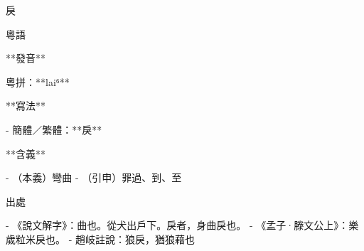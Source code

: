 戾

  



粵語

**發音**

粵拼：**lai⁶**

**寫法**

- 簡體／繁體：**戾**

**含義**

- （本義）彎曲
- （引申）罪過、到、至

出處

- 《說文解字》：曲也。從犬出戶下。戾者，身曲戾也。
- 《孟子·滕文公上》：樂歲粒米戾也。
- 趙岐註說：狼戾，猶狼藉也